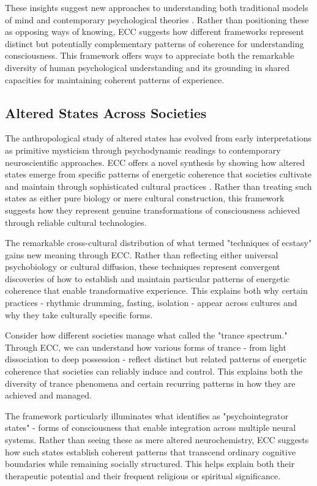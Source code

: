 \begin{refsection}
These insights suggest new approaches to understanding both traditional models of mind and contemporary psychological theories \cite{turner1967forest}. Rather than positioning these as opposing ways of knowing, ECC suggests how different frameworks represent distinct but potentially complementary patterns of coherence for understanding consciousness. This framework offers ways to appreciate both the remarkable diversity of human psychological understanding and its grounding in shared capacities for maintaining coherent patterns of experience.

\subsection{Altered States Across Societies}

The anthropological study of altered states has evolved from early interpretations as primitive mysticism through psychodynamic readings to contemporary neuroscientific approaches. ECC offers a novel synthesis by showing how altered states emerge from specific patterns of energetic coherence that societies cultivate and maintain through sophisticated cultural practices \cite{bourguignon1976possession}. Rather than treating such states as either pure biology or mere cultural construction, this framework suggests how they represent genuine transformations of consciousness achieved through reliable cultural technologies.

The remarkable cross-cultural distribution of what \cite{eliade1964shamanism} termed "techniques of ecstasy" gains new meaning through ECC. Rather than reflecting either universal psychobiology or cultural diffusion, these techniques represent convergent discoveries of how to establish and maintain particular patterns of energetic coherence that enable transformative experience. This explains both why certain practices - rhythmic drumming, fasting, isolation - appear across cultures and why they take culturally specific forms.

Consider how different societies manage what \cite{lapassade1990transe} called the "trance spectrum." Through ECC, we can understand how various forms of trance - from light dissociation to deep possession - reflect distinct but related patterns of energetic coherence that societies can reliably induce and control. This explains both the diversity of trance phenomena and certain recurring patterns in how they are achieved and managed.

The framework particularly illuminates what \cite{winkelman2010shamanism} identifies as "psychointegrator states" - forms of consciousness that enable integration across multiple neural systems. Rather than seeing these as mere altered neurochemistry, ECC suggests how such states establish coherent patterns that transcend ordinary cognitive boundaries while remaining socially structured. This helps explain both their therapeutic potential and their frequent religious or spiritual significance.


\end{refsection}
